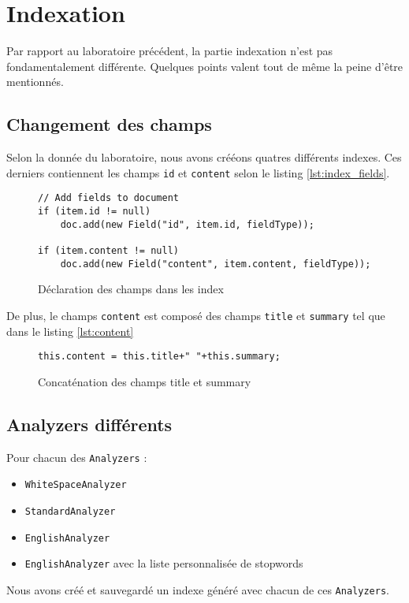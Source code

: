 

\chapter{Indexation}

Par rapport au laboratoire précédent, la partie indexation n'est pas fondamentalement différente. Quelques points valent tout de même la peine d'être mentionnés.


\section{Changement des champs}

Selon la donnée du laboratoire, nous avons crééons quatres différents indexes. Ces derniers contiennent les champs \texttt{id} et \texttt{content} selon le listing \autoref{lst:index_fields}.

\begin{figure}[H]
\centering
\begin{lstlisting}	
// Add fields to document
if (item.id != null)
    doc.add(new Field("id", item.id, fieldType));

if (item.content != null)
    doc.add(new Field("content", item.content, fieldType));
\end{lstlisting}
\caption{Déclaration des champs dans les index}
\label{lst:index_fields}
\end{figure}

De plus, le champs \texttt{content} est composé des champs \texttt{title} et \texttt{summary} tel que dans le listing \autoref{lst:content}

\begin{figure}[H]
\centering
\begin{lstlisting}	
this.content = this.title+" "+this.summary;
\end{lstlisting}
\caption{Concaténation des champs title et summary}
\label{lst:content}
\end{figure}

\section{Analyzers différents}

Pour chacun des \texttt{Analyzers} :

\begin{itemize}
	\item \texttt{WhiteSpaceAnalyzer}
	\item \texttt{StandardAnalyzer}
	\item \texttt{EnglishAnalyzer}
	\item \texttt{EnglishAnalyzer} avec la liste personnalisée de stopwords
\end{itemize}

Nous avons créé et sauvegardé un indexe généré avec chacun de ces \texttt{Analyzers}.